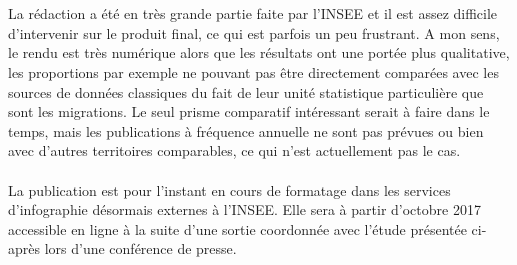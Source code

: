 \documentclass{bredele}
\begin{document}
\\\\La rédaction a été en très grande partie faite par l'INSEE et il est assez difficile d'intervenir sur le produit final, ce qui est parfois un peu frustrant. A mon sens, le rendu est très numérique alors que les résultats ont une portée plus qualitative, les proportions par exemple ne pouvant pas être directement comparées avec les sources de données classiques du fait de leur unité statistique particulière que sont les migrations. Le seul prisme comparatif intéressant serait à faire dans le temps, mais les publications à fréquence annuelle ne sont pas prévues ou bien avec d'autres territoires comparables, ce qui n'est actuellement pas le cas.
\\\\La publication est pour l'instant en cours de formatage dans les services d'infographie désormais externes à l'INSEE. Elle sera à partir d'octobre 2017 accessible en ligne à la suite d'une sortie coordonnée avec l'étude présentée ci-après lors d'une conférence de presse.
\end{document}
